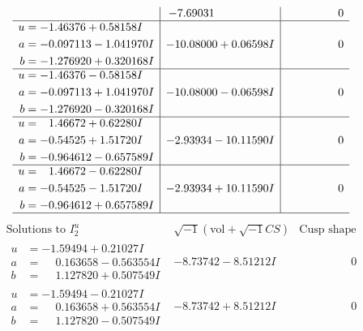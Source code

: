 \documentclass[1p]{elsarticle_modified}
\theoremstyle{definition}
\newcommand{\I}{\sqrt{-1}}
\begin{document}
$$\begin{array}{c|c|c}
 & -7.69031\phantom{ +0.000000I} & \phantom{-0.000000 } 0 \\ \hline\begin{aligned}
u &= -1.46376 + 0.58158 I \\
a &= -0.097113 - 1.041970 I \\
b &= -1.276920 + 0.320168 I\end{aligned}
 & -10.08000 + 0.06598 I & \phantom{-0.000000 } 0 \\ \hline\begin{aligned}
u &= -1.46376 - 0.58158 I \\
a &= -0.097113 + 1.041970 I \\
b &= -1.276920 - 0.320168 I\end{aligned}
 & -10.08000 - 0.06598 I & \phantom{-0.000000 } 0 \\ \hline\begin{aligned}
u &= \phantom{-}1.46672 + 0.62280 I \\
a &= -0.54525 + 1.51720 I \\
b &= -0.964612 - 0.657589 I\end{aligned}
 & -2.93934 - 10.11590 I & \phantom{-0.000000 } 0 \\ \hline\begin{aligned}
u &= \phantom{-}1.46672 - 0.62280 I \\
a &= -0.54525 - 1.51720 I \\
b &= -0.964612 + 0.657589 I\end{aligned}
 & -2.93934 + 10.11590 I & \phantom{-0.000000 } 0\\
 \hline 
 \end{array}$$\newpage$$\begin{array}{c|c|c}  
\text{Solutions to }I^u_{2}& \I (\text{vol} + \sqrt{-1}CS) & \text{Cusp shape}\\
 \hline 
\begin{aligned}
u &= -1.59494 + 0.21027 I \\
a &= \phantom{-}0.163658 - 0.563554 I \\
b &= \phantom{-}1.127820 + 0.507549 I\end{aligned}
 & -8.73742 - 8.51212 I & \phantom{-0.000000 } 0 \\ \hline\begin{aligned}
u &= -1.59494 - 0.21027 I \\
a &= \phantom{-}0.163658 + 0.563554 I \\
b &= \phantom{-}1.127820 - 0.507549 I\end{aligned}
 & -8.73742 + 8.51212 I & \phantom{-0.000000 } 0 \\ \hline\begin{aligned}

\end{aligned}
\end{array}$$
\end{document}
